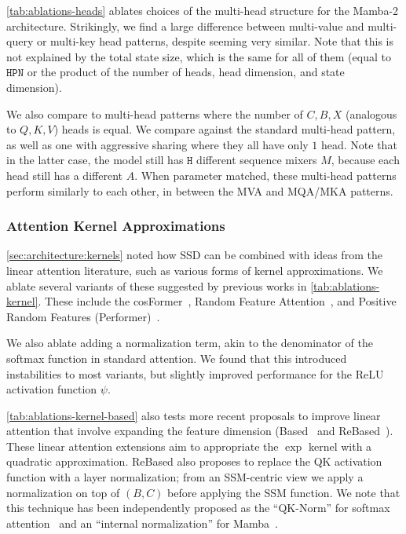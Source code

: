 \ref{tab:ablations-heads} ablates choices of the multi-head structure for the Mamba-2 architecture. Strikingly, we find a large difference between multi-value and multi-query or multi-key head patterns, despite seeming very similar. Note that this is not explained by the total state size, which is the same for all of them (equal to $\mathtt{HPN}$ or the product of the number of heads, head dimension, and state dimension).

We also compare to multi-head patterns where the number of $C, B, X$ (analogous to $Q, K, V$) heads is equal. We compare against the standard multi-head pattern, as well as one with aggressive sharing where they all have only $1$ head. Note that in the latter case, the model still has $\mathtt{H}$ different sequence mixers $M$, because each head still has a different $A$. When parameter matched, these multi-head patterns perform similarly to each other, in between the MVA and MQA/MKA patterns.

\subsubsection{Attention Kernel Approximations}
\label{sec:experiments:ablations:kernels}

\ref{sec:architecture:kernels} noted how SSD can be combined with ideas from the linear attention literature, such as various forms of kernel approximations. We ablate several variants of these suggested by previous works in \ref{tab:ablations-kernel}.
These include the cosFormer~\citep{qin2022cosformer}, Random Feature Attention~\cite{peng2021random}, and Positive Random Features (Performer)~\citep{choromanski2021rethinking}.

We also ablate adding a normalization term, akin to the denominator of the softmax function in standard attention. We found that this introduced instabilities to most variants, but slightly improved performance for the ReLU activation function $\psi$.

\ref{tab:ablations-kernel-based} also tests more recent proposals to improve linear attention that involve expanding the feature dimension (Based~\citep{arora2024simple} and ReBased~\citep{aksenov2024linear}).
These linear attention extensions aim to appropriate the $\exp$ kernel with a quadratic approximation. ReBased also proposes to replace the QK activation function with a layer normalization; from an SSM-centric view we apply a normalization on top of $(B, C)$ before applying the SSM function. We note that this technique has been independently proposed as the ``QK-Norm'' for softmax attention~\citep{team2024chameleon}
and an ``internal normalization'' for Mamba~\citep{lieber2024jamba}.

